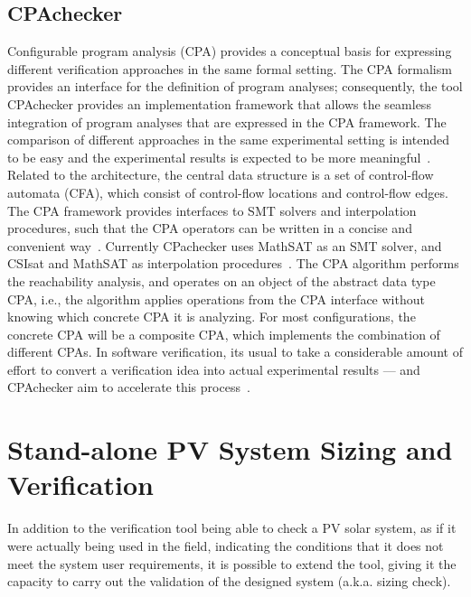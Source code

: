 \documentclass[review]{elsarticle}
\begin{document}
\subsection{CPAchecker}
Configurable program analysis (CPA) provides a conceptual basis for expressing different verification approaches in the same formal setting. The CPA formalism provides an interface for the definition of program analyses; consequently, the tool CPAchecker provides an implementation framework that allows the seamless integration of program analyses that are expressed in the CPA framework. The comparison of different approaches in the same experimental setting is intended to be easy and the experimental results is expected to be more meaningful~\cite{Beyer2011}. Related to the architecture, the central data structure is a set of control-flow automata (CFA), which consist of control-flow locations and control-flow edges. The CPA framework provides interfaces to SMT solvers and interpolation procedures, such that the CPA operators can be written in a concise and convenient way~\cite{Beyer2011}. Currently CPachecker uses MathSAT as an SMT solver, and CSIsat and MathSAT as interpolation procedures~\cite{Beyer2011}. The CPA algorithm performs the reachability analysis, and operates on an object of the abstract data type CPA, i.e., the algorithm applies operations from the CPA interface without knowing which concrete CPA it is analyzing. For most configurations, the concrete CPA will be a composite CPA, which implements the combination of different CPAs. In software verification, its usual to take a considerable amount of effort to convert a verification idea into actual experimental results — and CPAchecker aim to accelerate this process~\cite{Beyer2011}.
%
\section{Stand-alone PV System Sizing and Verification}
\label{sec:sizingcheck}
In addition to the verification tool being able to check a PV solar system, as if it were actually being used in the field, indicating the conditions that it does not meet the system user requirements, it is possible to extend the tool, giving it the capacity to carry out the validation of the designed system (a.k.a. sizing check).
\end{document}
